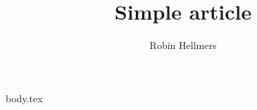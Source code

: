 \documentclass{article}
\title{Simple article}
\author{Robin Hellmers}
\begin{document}
    
\maketitle
\newpage
\tableofcontents
\newpage

{body.tex}
\end{document}
